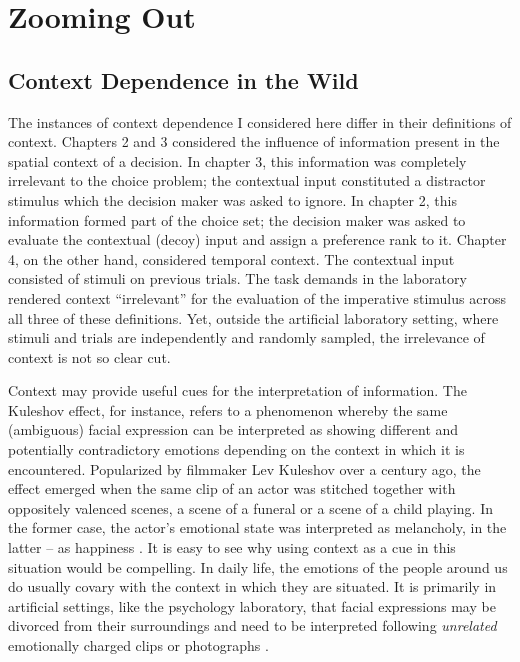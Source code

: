 \documentclass[a4paper, nobind]{templates/ociamthesis}
\begin{document}
\hypertarget{zooming-out}{%
\section{Zooming Out}\label{zooming-out}}

\hypertarget{context-dependence-in-the-wild}{%
\subsection{Context Dependence in the Wild}\label{context-dependence-in-the-wild}}

The instances of context dependence I considered here differ in their definitions of context. Chapters 2 and 3 considered the influence of information present in the spatial context of a decision. In chapter 3, this information was completely irrelevant to the choice problem; the contextual input constituted a distractor stimulus which the decision maker was asked to ignore. In chapter 2, this information formed part of the choice set; the decision maker was asked to evaluate the contextual (decoy) input and assign a preference rank to it. Chapter 4, on the other hand, considered temporal context. The contextual input consisted of stimuli on previous trials. The task demands in the laboratory rendered context ``irrelevant'' for the evaluation of the imperative stimulus across all three of these definitions. Yet, outside the artificial laboratory setting, where stimuli and trials are independently and randomly sampled, the irrelevance of context is not so clear cut.

Context may provide useful cues for the interpretation of information. The Kuleshov effect, for instance, refers to a phenomenon whereby the same (ambiguous) facial expression can be interpreted as showing different and potentially contradictory emotions depending on the context in which it is encountered. Popularized by filmmaker Lev Kuleshov over a century ago, the effect emerged when the same clip of an actor was stitched together with oppositely valenced scenes, a scene of a funeral or a scene of a child playing. In the former case, the actor's emotional state was interpreted as melancholy, in the latter -- as happiness \autocite{mobbs2006}. It is easy to see why using context as a cue in this situation would be compelling. In daily life, the emotions of the people around us do usually covary with the context in which they are situated. It is primarily in artificial settings, like the psychology laboratory, that facial expressions may be divorced from their surroundings and need to be interpreted following \emph{unrelated} emotionally charged clips \autocite{mobbs2006} or photographs \autocite{mullennix2019}.
\end{document}
